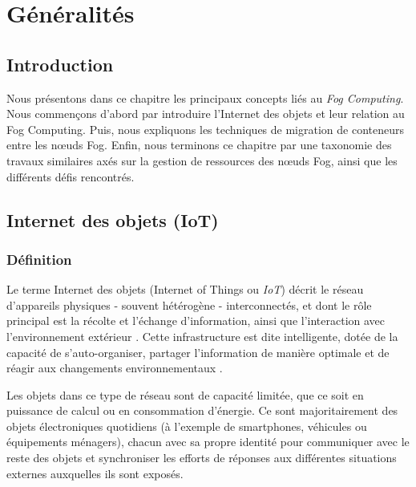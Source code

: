\chapter{Généralités}

\section{Introduction}
Nous présentons dans ce chapitre les principaux concepts liés au \emph{\gls{Fog Computing}}. Nous commençons d'abord par introduire l'Internet des objets et leur relation au Fog Computing. Puis, nous expliquons les techniques de migration de conteneurs entre les nœuds Fog. Enfin, nous terminons ce chapitre par une taxonomie des travaux similaires axés sur la gestion de ressources des nœuds Fog, ainsi que les différents défis rencontrés. 

\section{Internet des objets (IoT)}
\subsection{Définition}
Le terme Internet des objets (Internet of Things ou \emph{\gls{IoT}}) décrit le réseau d'appareils physiques - souvent hétérogène - interconnectés, et dont le rôle principal est la récolte et l'échange d'information, ainsi que l'interaction avec l'environnement extérieur \cite{patel2016}. Cette infrastructure est dite intelligente, dotée de la capacité de s'auto-organiser, partager l'information de manière optimale et de réagir aux changements environnementaux \cite{madakam2015}.\par
Les objets dans ce type de réseau sont de capacité limitée, que ce soit en puissance de calcul ou en consommation d'énergie. Ce sont majoritairement des objets électroniques quotidiens (à l'exemple de smartphones, véhicules ou équipements ménagers), chacun avec sa propre identité pour communiquer avec le reste des objets et synchroniser les efforts de réponses aux différentes situations externes auxquelles ils sont exposés.

